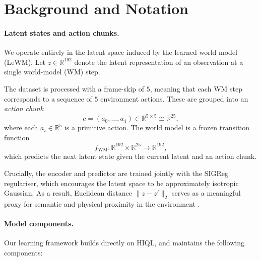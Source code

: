 \section{Background and Notation}
\label{sec:wgsp:background}

\paragraph{Latent states and action chunks.}
We operate entirely in the latent space induced by the learned world
model (LeWM). Let $z \in \mathbb{R}^{192}$ denote the latent
representation of an observation at a single world-model (WM) step.

The dataset is processed with a frame-skip of $5$, meaning that each WM
step corresponds to a sequence of $5$ environment actions. These are
grouped into an \emph{action chunk}
\[
c = (a_0, \dots, a_4) \in \mathbb{R}^{5 \times 5} \cong \mathbb{R}^{25},
\]
where each $a_i \in \mathbb{R}^5$ is a primitive action. The world model
is a frozen transition function
\[
f_{\mathrm{WM}} : \mathbb{R}^{192} \times \mathbb{R}^{25} \to \mathbb{R}^{192},
\]
which predicts the next latent state given the current latent and an
action chunk.

Crucially, the encoder and predictor are trained jointly with the
SIGReg regulariser, which encourages the latent space to be
approximately isotropic Gaussian. As a result, Euclidean distance
$\|z - z'\|_2$ serves as a meaningful proxy for semantic and physical
proximity in the environment \citep{lejepa}.

\paragraph{Model components.}
Our learning framework builds directly on HIQL, and maintains the
following components:

